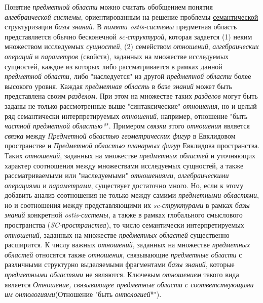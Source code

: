 \begin{SCn}
{	Понятие \textit{предметной области} можно считать обобщением понятия \textit{алгебраической системы}, ориентированным на решение проблемы \uline{семантической} структуризации \textit{базы знаний}. В \textit{памяти ostis-системы} предметная область представляется обычно бесконечной \textit{sc-структурой}, которая задается (1) неким множеством исследуемых \textit{сущностей}, (2) семейством \textit{отношений}, \textit{алгебраических операций} и \textit{параметров} (свойств), заданных на множестве исследуемых сущностей, каждое из которых либо рассматривается в рамках данной \textit{предметной области}, либо "наследуется"{} из другой \textit{предметной области} более высокого уровня. Каждая \textit{предметная область} в \textit{базе знаний} может быть представлена своим \textit{разделом}. При этом на множестве таких \textit{разделов} могут быть заданы не только рассмотренные выше "синтаксические"{} \textit{отношения}, но и целый ряд семантически интерпретируемых \textit{отношений}, например, отношение "быть \textit{частной предметной областью*}"{}. Примером \textit{связки} этого \textit{отношения} является \textit{связка} между \textit{Предметной областью геометрических фигур} в Евклидовом пространстве и \textit{Предметной областью планарных фигур} Евклидова пространства. Таких \textit{отношений}, заданных на множестве \textit{предметных областей} и уточняющих характер соотношения между множествами исследуемых сущностей, а также рассматриваемыми или "наследуемыми"{} \textit{отношениями}, \textit{алгебраическими операциями} и \textit{параметрами}, существует достаточно много. Но, если к этому добавить анализ соотношения не только между самими \textit{предметными областями}, но и соотношения между представляющими их \textit{sc-структурами} в рамках \textit{базы знаний} конкретной \textit{ostis-системы}, а также в рамках глобального смыслового пространства (\textit{SC-пространства}), то число семантически интерпретируемых \textit{отношений}, заданных на множестве \textit{предметных областей} существенно расширится. К числу важных \textit{отношений}, заданных на множестве \textit{предметных областей} относятся также \textit{отношения}, связывающие \textit{предметные области} с различными структурно выделяемыми фрагментами \textit{базы знаний}, которые \textit{предметными областями} не являются. Ключевым \textit{отношением} такого вида является \textit{Отношение, связывающее предметные области с соответствующими им онтологиями}(Отношение "быть \textit{онтологией}*").} 


\end{SCn}
